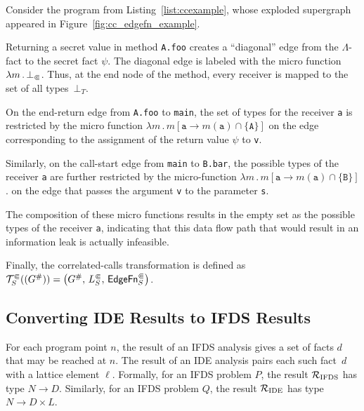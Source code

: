 \begin{example}
  Consider the program from Listing~\ref{list:ccexample}, whose exploded supergraph appeared in Figure~\ref{fig:cc_edgefn_example}.

  Returning a secret value in method \verb'A.foo' creates a ``diagonal'' edge from the $\Lambda$-fact to the secret fact $\psi$. 
  The diagonal edge is labeled with the micro function $\lambda m\,.\,\bot_\Subset$. Thus, at the end node of the method, every receiver is mapped to the set of all types~$\bot_T$.
  
On the end-return edge from \verb'A.foo' to \verb'main', the set of types for the receiver \verb'a' is restricted by the micro function $\lambda m\,.\,m[\texttt a\to m(\texttt a)\cap\{\texttt A\}]$ on the edge corresponding to the assignment of the return value $\psi$ to \verb'v'.

Similarly, on the call-start edge from \verb'main' to \verb'B.bar', the possible types
of the receiver \verb'a' are further restricted by the micro-function
$\lambda m\,.\,m[\texttt a\to m(\texttt a)\cap\{\texttt B\}]$.
on the edge that passes the argument \verb'v' to the parameter \verb's'.

The composition of these micro functions results in the empty set as the possible
types of the receiver \verb'a', indicating that this data flow path that would
result in an information leak is actually infeasible.
\end{example}


Finally, the correlated-calls transformation is defined as
    $\mathcal T^\Subset_S((G^\#))=\left(G^\#,\,L^\Subset_S,\,\textsf{EdgeFn}^\Subset_{S}\right)$.


\subsection{Converting IDE Results to IFDS Results}

For each program point $n$, the result of an IFDS analysis gives
a set of facts $d$ that may be reached at $n$. The result of an IDE analysis
pairs each such fact~$d$ with a lattice element $\ell$. Formally,
for an IFDS problem $P$, the result $\mathcal R_{\text{IFDS}}$ has type
$N \to D$. Similarly, for an IFDS problem $Q$, the result $\mathcal R_{\text{IDE}}$
has type $N \to D \times L$.

